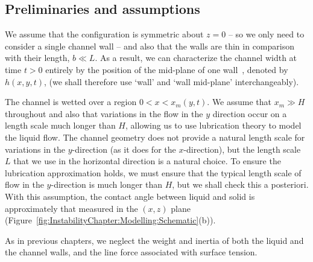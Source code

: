 \subsection{Preliminaries and assumptions}
We assume that the configuration is symmetric about $z = 0$ -- so we only need to consider a single channel wall -- and also that the walls are thin in comparison with their length, $b \ll L$. As a result, we can characterize the channel width at time $t > 0$ entirely by the position of the mid-plane of one wall~\citep{Reddy2006}, denoted by $h(x,y,t)$, (we shall therefore use `wall' and `wall mid-plane' interchangeably).

The channel is wetted over a region $0 < x < x_m(y,t)$. We assume that $x_m \gg H$ throughout and also that variations in the flow in the $y$ direction occur on a length scale much longer than $H$, allowing us to use lubrication theory to model the liquid flow. The channel geometry does not provide a natural length scale for variations in the $y$-direction (as it does for the $x$-direction), but the length scale $L$ that we use in the horizontal direction is a natural choice. To ensure the lubrication approximation holds, we must ensure that the typical length scale of flow in the $y$-direction is much longer than $H$, but we shall check this a posteriori. With this assumption, the contact angle between liquid and solid is approximately that measured in the $(x,z)$ plane (Figure~\ref{fig:InstabilityChapter:Modelling:Schematic}(b)).

As in previous chapters, we neglect the weight and inertia of both the liquid and the channel walls, and the line force associated with surface tension.



